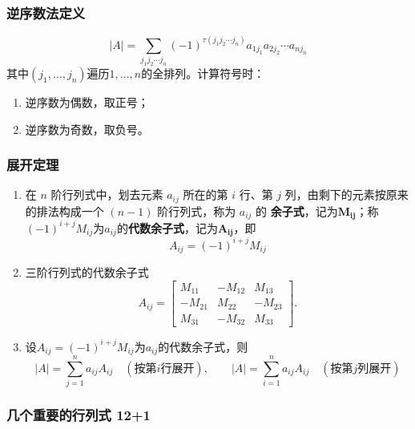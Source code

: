 \documentclass[./linear_algebra.tex]{subfiles}
\begin{document}
    \subsubsection{逆序数法定义}
    \[
        |A|=\sum_{j_1j_2\cdots j_n}(-1)^{\tau(j_1j_2\cdots j_n)}
        a_{1j_1}a_{2j_2}\cdots a_{nj_n}
    \]
    其中$(j_1,\dots,j_n)$遍历$1,\dots,n$的全排列。计算符号时：
    \begin{enumerate}
        \item 逆序数为偶数，取正号；
        \item 逆序数为奇数，取负号。
    \end{enumerate}

    \subsubsection{展开定理}

    \begin{enumerate}
        \item 在 $n$ 阶行列式中，划去元素 $a_{ij}$ 所在的第 $i$ 行、第 $j$ 列，由剩下的元素按原来的排法构成一个 $(n-1)$ 阶行列式，称为 $a_{ij}$ 的 \textbf{余子式}，记为$\mathbf{M_{ij}}$；称$(-1)^{i+j}M_{ij}$为$a_{ij}$的\textbf{代数余子式}，记为$\mathbf{A_{ij}}$，即
        \[
            A_{ij} = (-1)^{i+j}M_{ij}
        \]
        \item 三阶行列式的代数余子式
        \[
            A_{ij} =
            \begin{bmatrix}
                M_{11}  & -M_{12} & M_{13}  \\
                -M_{21} & M_{22}  & -M_{23} \\
                M_{31}  & -M_{32} & M_{33}
            \end{bmatrix}.
        \]
        \item 设$A_{ij}=(-1)^{i+j}M_{ij}$为$a_{ij}$的代数余子式，则
        \[
            |A|=\sum_{j=1}^{n}a_{ij}A_{ij}\quad(\text{按第}i\text{行展开}),\qquad
            |A|=\sum_{i=1}^{n}a_{ij}A_{ij}\quad(\text{按第}j\text{列展开})
        \]
    \end{enumerate}

    \subsubsection{几个重要的行列式 12+1}
\end{document}
